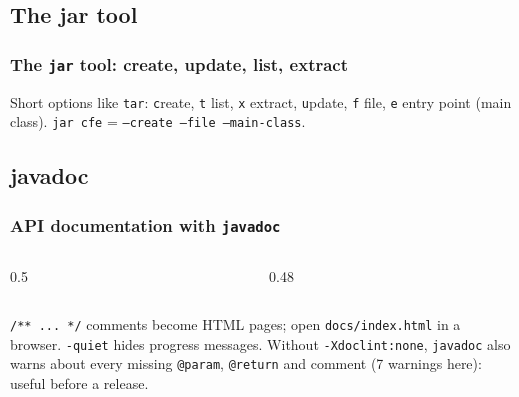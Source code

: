 \documentclass[aspectratio=169,10pt,compress]{beamer}
\begin{document}
\subsection[Tool]{The jar tool}




\begin{frame}[t,fragile] \frametitle{The \texttt{jar} tool: create, update, list, extract}

  \vspace{0.2em}
  \small Short options like \texttt{tar}: \texttt{c}reate, \texttt{t} list, \texttt{x} extract, \texttt{u}pdate,
  \texttt{f} file, \texttt{e} entry point (main class). \texttt{jar cfe} = \texttt{--create --file --main-class}.
\end{frame}


\subsection[Javadoc]{javadoc}




\begin{frame}[t,fragile] \frametitle{API documentation with \texttt{javadoc}}
  \begin{columns}[T]
    \begin{column}{0.5\textwidth}
    \end{column}
    \begin{column}{0.48\textwidth}
    \end{column}
  \end{columns}

  \vspace{0.2em}
  \small \texttt{/** ... */} comments become HTML pages; open \texttt{docs/index.html} in a browser.
  \texttt{-quiet} hides progress messages. Without \texttt{-Xdoclint:none}, \texttt{javadoc} also warns about every missing
  \texttt{@param}, \texttt{@return} and comment (7 warnings here): useful before a release.
\end{frame}
\end{document}

